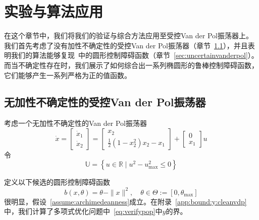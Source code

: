 
\chapter{实验与算法应用}
\label{sec:experiments}

在这个章节中，我们将我们的验证与综合方法应用至受控Van der Pol振荡器上。我们首先考虑了没有加性不确定性的受控Van der Pol振荡器（章节~\ref{sec:cleanvanderpol}），并且表明我们的算法能够复现~\cite{clark22arxiv-cbf}中的圆形控制障碍函数（章节~\ref{sec:uncertainvanderpol}）。而当不确定性存在时，我们展示了如何综合出一系列椭圆形的鲁棒控制障碍函数，它们能够产生一系列严格为正的值函数。

\section{无加性不确定性的受控Van der Pol振荡器}
\label{sec:cleanvanderpol}

考虑一个无加性不确定性的Van der Pol振荡器~\cite{clark22arxiv-cbf}
\begin{equation}\label{eq:cleanvdpodynamics}
    \dot{x} = \left[ \begin{array}{c}
        \dot{x}_1 \\ \dot{x}_2
    \end{array} \right] 
    = \left[ \begin{array}{c}
        x_2 \\
        \frac{1}{2}(1 - x_2^2) x_2 - x_1
    \end{array} \right]
    + \left[ \begin{array}{c}
        0 \\ x_1
    \end{array} \right] u
\end{equation}
令
\begin{equation}\label{eq:cleanvdpou}
    \mathbb{U} = \left\{ u \in \mathbb{R} \mid u^2 - u_{\max}^2 \le 0 \right\}
\end{equation}

定义以下候选的圆形控制障碍函数
\begin{equation}
    \label{eq:cleanvdpocbf}
    b(x, \theta) = \theta - \parallel x \parallel^2, \quad \theta \in \Theta := [0, \theta_{\max}]
\end{equation}
很明显，假设~\ref{assume:archimedeanness}成立。在附录~\ref{app:bound:y:cleanvdp}中，我们计算了多项式优化问题中~\eqref{eq:verifypop}中$y$的界。

